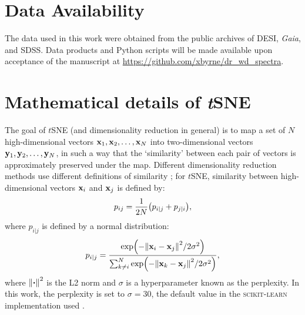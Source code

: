 \documentclass[fleqn,usenatbib]{mnras}
\def\xb{\vb{x}}
\def\yb{\vb{y}}
\begin{document}
\section*{Data Availability}

The data used in this work were obtained from the public archives of DESI, \textit{Gaia}, and SDSS.
Data products and Python scripts will be made available upon acceptance of the manuscript at \url{https://github.com/xbyrne/dr_wd_spectra}.









\appendix

\section{Mathematical details of \textit{t}SNE}
\label{sec:app}

The goal of $t$SNE (and dimensionality reduction in general) is to map a set of $N$ high-dimensional vectors $\xb_1, \xb_2, \dots, \xb_N$ into two-dimensional vectors $\yb_1, \yb_2, \dots, \yb_N$, in such a way that the `similarity' between each pair of vectors is approximately preserved under the map.
Different dimensionality reduction methods use different definitions of similarity \citep{umap}; for $t$SNE, similarity between high-dimensional vectors $\xb_i$ and $\xb_j$ is defined by:
\begin{equation}
p_{ij}
= \frac{1}{2N} \qty(
    p_{i|j} + p_{j|i}
),
\end{equation}
where $p_{i|j}$ is defined by a normal distribution:
\begin{equation}
p_{i|j}
= \frac{
    \exp(-\norm{\xb_i - \xb_j}^2 / 2\sigma^2)
}{
    \sum_{k\neq i}^N
    \exp(-\norm{\xb_k - \xb_j}^2 / 2\sigma^2)
},
\end{equation}
where $\norm{\vdot}^2$ is the L2 norm and $\sigma$ is a hyperparameter known as the perplexity.
In this work, the perplexity is set to $\sigma=30$, the default value in the \textsc{scikit-learn} implementation used \citep{sklearn}.
\end{document}
